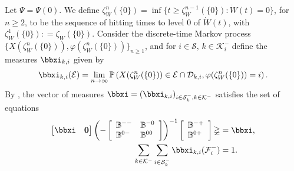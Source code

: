 Let $\mathbb\Psi = \mathbb\Psi(0)$. We define $\zeta_W^n(\{0\}) = \inf\{t \geq \zeta_W^{n - 1}(\{0\}): \dot W(t) = 0\}$, for $n \geq  2$, to be the sequence of hitting times to level $0$ of $\dot W(t)$, with $\zeta_W^1(\{0\}): = \zeta_W(\{0\})$. Consider the discrete-time Markov process $\{X({\zeta_W^n(\{0\})}), \varphi(\zeta_W^n(\{0\}))\}_{n \geq 1}$, and for $i \in \mathcal{S},\,k\in\mathcal K_i^-$ define the measures $\bbxi_{k,i}$ given by 
	\begin{align*}
		\bbxi_{k,i}(\mathcal{E}) = \lim_{n \rightarrow \infty} \mathbb{P}\left(X(\zeta_W^n(\{0\})) \in \mathcal{E}\cap\calD_{k,i}, \varphi(\zeta_W^n(\{0\})) = i\right).
	\end{align*} 
	By \cite{bo2014}, the vector of measures $\boldsymbol{\bbxi} = (\bbxi_{k,i})_{i \in \mathcal{S}_k^-,k\in\mathcal K^-}$ satisfies the set of equations 
 	\begin{align}
		\vligne{\boldsymbol{\bbxi}  & \boldsymbol{0}}\left(-\left[\begin{array}{ll} 
			\mathbb{B}^{--} & \mathbb{B}^{-0} \\
			\mathbb{B}^{0-} & \mathbb{B}^{00} 
		\end{array} \right]\right)^{-1}\left[\begin{array}{l} 
			\mathbb{B}^{-+} \\ 
			\mathbb{B}^{0+}
		\end{array} \right]\mathbb\Psi & = \boldsymbol{\bbxi}, \label{eqn:xi1}\\ 
		\sum_{k\in\mathcal K^-}\sum_{i \in \mathcal{S}_k^-}\bbxi_{k,i}(\mathcal{F}^-_i) & = 1. \label{eqn:xi2}
	\end{align} 

